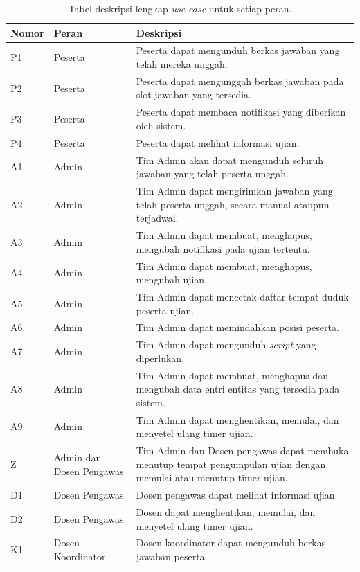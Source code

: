 \begin{table}[ht]
    \centering
    \begin{tabularx}{\textwidth}{|p{1.2cm}|p{2cm}|X|}
         \hline
         Nomor & Peran & Deskripsi  \\
         \hline
         P1 & Peserta & Peserta dapat mengunduh berkas jawaban yang telah mereka unggah. \\
         \hline
         P2 & Peserta & Peserta dapat mengunggah berkas jawaban pada slot jawaban yang tersedia. \\
         \hline
         P3 & Peserta & Peserta dapat membaca notifikasi yang diberikan oleh sistem. \\
         \hline
         P4 & Peserta & Peserta dapat melihat informasi ujian. \\
         \hline
         A1 & Admin & Tim Admin akan dapat mengunduh seluruh jawaban yang telah peserta unggah. \\
         \hline
         A2 & Admin & Tim Admin dapat mengirimkan jawaban yang telah peserta unggah, secara manual ataupun terjadwal. \\
         \hline
         A3 & Admin & Tim Admin dapat membuat, menghapus, mengubah notifikasi pada ujian tertentu. \\
         \hline
         A4 & Admin & Tim Admin dapat membuat, menghapus, mengubah ujian. \\
         \hline
         A5 & Admin & Tim Admin dapat mencetak daftar tempat duduk peserta ujian. \\
         \hline
         A6 & Admin & Tim Admin dapat memindahkan posisi peserta. \\
         \hline
         A7 & Admin & Tim Admin dapat mengunduh \textit{script} yang diperlukan. \\
         \hline
         A8 & Admin & Tim Admin dapat membuat, menghapus dan mengubah data entri entitas yang tersedia pada sistem. \\
         \hline
         A9 & Admin & Tim Admin dapat menghentikan, memulai, dan menyetel ulang timer ujian. \\
         \hline
         Z & Admin dan Dosen Pengawas & Tim Admin dan Dosen pengawas dapat membuka menutup tempat pengumpulan ujian dengan
         memulai atau menutup timer ujian. \\
         \hline
         D1 & Dosen Pengawas & Dosen pengawas dapat melihat informasi ujian. \\
         \hline
         D2 & Dosen Pengawas & Dosen dapat menghentikan, memulai, dan menyetel ulang timer ujian. \\
         \hline
         K1 & Dosen Koordinator & Dosen koordinator dapat mengunduh berkas jawaban peserta. \\
         \hline
    \end{tabularx}
    \caption{Tabel deskripsi lengkap \textit{use case} untuk setiap peran.}
    \label{tab:usecase_desc}
\end{table}
